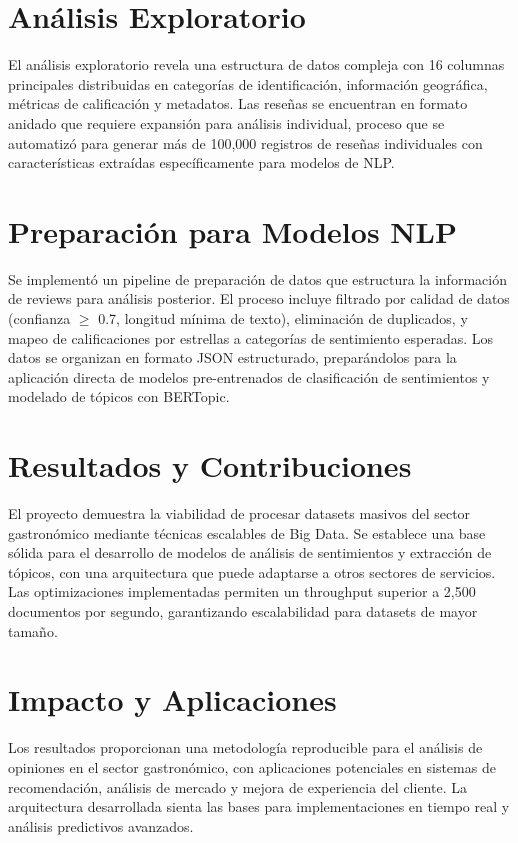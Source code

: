 \documentclass[12pt,a4paper,twoside,openany]{book}
\begin{document}
\section*{Análisis Exploratorio}

El análisis exploratorio revela una estructura de datos compleja con 16 columnas principales distribuidas en categorías de identificación, información geográfica, métricas de calificación y metadatos. Las reseñas se encuentran en formato anidado que requiere expansión para análisis individual, proceso que se automatizó para generar más de 100,000 registros de reseñas individuales con características extraídas específicamente para modelos de NLP.

\section*{Preparación para Modelos NLP}

Se implementó un pipeline de preparación de datos que estructura la información de reviews para análisis posterior. El proceso incluye filtrado por calidad de datos (confianza $\geq$ 0.7, longitud mínima de texto), eliminación de duplicados, y mapeo de calificaciones por estrellas a categorías de sentimiento esperadas. Los datos se organizan en formato JSON estructurado, preparándolos para la aplicación directa de modelos pre-entrenados de clasificación de sentimientos y modelado de tópicos con BERTopic.

\section*{Resultados y Contribuciones}

El proyecto demuestra la viabilidad de procesar datasets masivos del sector gastronómico mediante técnicas escalables de Big Data. Se establece una base sólida para el desarrollo de modelos de análisis de sentimientos y extracción de tópicos, con una arquitectura que puede adaptarse a otros sectores de servicios. Las optimizaciones implementadas permiten un throughput superior a 2,500 documentos por segundo, garantizando escalabilidad para datasets de mayor tamaño.

\section*{Impacto y Aplicaciones}

Los resultados proporcionan una metodología reproducible para el análisis de opiniones en el sector gastronómico, con aplicaciones potenciales en sistemas de recomendación, análisis de mercado y mejora de experiencia del cliente. La arquitectura desarrollada sienta las bases para implementaciones en tiempo real y análisis predictivos avanzados.
\end{document}
